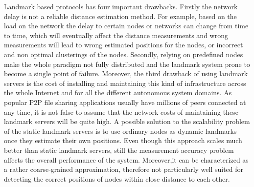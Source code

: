 Landmark based protocols has four important drawbacks. Firstly the network
delay is not a reliable distance estimation method. For example, based on the
load on the network the delay to certain nodes or networks can change from time
to time, which will eventually affect the distance measurements and wrong
measurements will lead to wrong estimated positions for the nodes, or incorrect
and non optimal clusterings of the nodes. Secondly, relying on predefined nodes
make the whole paradigm not fully distributed and the landmark system prone to
become a single point of failure. Moreover, the third drawback of using
landmark servers is the cost of installing and maintaining this kind of
infrastructure across the whole Internet and for all the different autonomous
system domains. As popular P2P file sharing applications usually have millions
of peers connected at any time, it is not false to assume that the network costs
of maintaining these landmark servers will be quite high. A possible solution to
the scalability problem of the static landmark servers is to use ordinary nodes
as dynamic landmarks once they estimate their own positions. Even though this
approach scales much better than static landmark servers, still the measurement
accuracy problem affects the overall performance of the system. Moreover,it can
be characterized as a rather coarse-grained approximation, therefore not
particularly well suited for detecting the correct positions of nodes within
close distance to each other.




